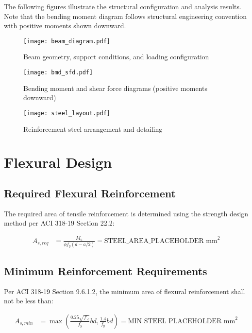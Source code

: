 \documentclass[
  11pt,
  letterpaper,
  onecolumn
]{article}
\begin{document}
The following figures illustrate the structural configuration and analysis results. Note that the bending moment diagram follows structural engineering convention with positive moments shown downward.

\begin{figure}[H]
\centering
\texttt{[image: beam\_diagram.pdf]}
\caption{Beam geometry, support conditions, and loading configuration}
\label{fig:beam_geometry}
\end{figure}

\begin{figure}[H]
\centering
\texttt{[image: bmd\_sfd.pdf]}
\caption{Bending moment and shear force diagrams (positive moments downward)}
\label{fig:bmd_sfd}
\end{figure}

\begin{figure}[H]
\centering
\texttt{[image: steel\_layout.pdf]}
\caption{Reinforcement steel arrangement and detailing}
\label{fig:steel_layout}
\end{figure}

\section{Flexural Design}

\subsection{Required Flexural Reinforcement}

The required area of tensile reinforcement is determined using the strength design method per ACI 318-19 Section 22.2:

\begin{align}
A_{s,req} &= \frac{M_u}{\phi f_y (d - a/2)} = \text{STEEL_AREA_PLACEHOLDER mm}^2 \label{eq:steel_req}
\end{align}

\subsection{Minimum Reinforcement Requirements}

Per ACI 318-19 Section 9.6.1.2, the minimum area of flexural reinforcement shall not be less than:

\begin{align}
A_{s,min} &= \max\left(\frac{0.25\sqrt{f'_c}}{f_y}bd, \frac{1.4}{f_y}bd\right) = \text{MIN_STEEL_PLACEHOLDER mm}^2 \label{eq:steel_min}
\end{align}
\end{document}
